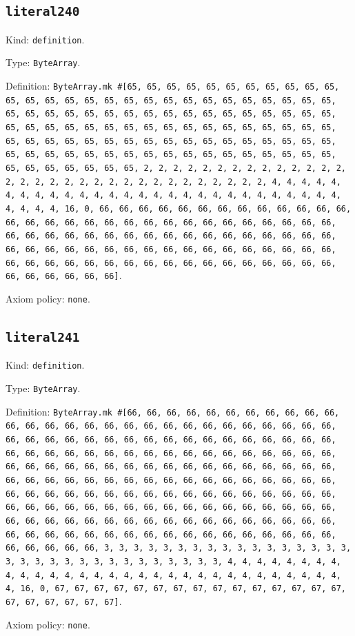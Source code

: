 \documentclass[11pt]{article}
\begin{document}
\subsection*{\texttt{literal240}}
\noindent Kind: \texttt{definition}.\par
\noindent Type: \texttt{ByteArray}.\par
\noindent Definition: \texttt{ByteArray.mk \#[65, 65, 65, 65, 65, 65, 65, 65, 65, 65, 65, 65, 65, 65, 65, 65, 65, 65, 65, 65, 65, 65, 65, 65, 65, 65, 65, 65, 65, 65, 65, 65, 65, 65, 65, 65, 65, 65, 65, 65, 65, 65, 65, 65, 65, 65, 65, 65, 65, 65, 65, 65, 65, 65, 65, 65, 65, 65, 65, 65, 65, 65, 65, 65, 65, 65, 65, 65, 65, 65, 65, 65, 65, 65, 65, 65, 65, 65, 65, 65, 65, 65, 65, 65, 65, 65, 65, 65, 65, 65, 65, 65, 65, 65, 65, 65, 65, 65, 65, 65, 65, 65, 65, 2, 2, 2, 2, 2, 2, 2, 2, 2, 2, 2, 2, 2, 2, 2, 2, 2, 2, 2, 2, 2, 2, 2, 2, 2, 2, 2, 2, 2, 2, 2, 2, 4, 4, 4, 4, 4, 4, 4, 4, 4, 4, 4, 4, 4, 4, 4, 4, 4, 4, 4, 4, 4, 4, 4, 4, 4, 4, 4, 4, 4, 4, 4, 4, 16, 0, 66, 66, 66, 66, 66, 66, 66, 66, 66, 66, 66, 66, 66, 66, 66, 66, 66, 66, 66, 66, 66, 66, 66, 66, 66, 66, 66, 66, 66, 66, 66, 66, 66, 66, 66, 66, 66, 66, 66, 66, 66, 66, 66, 66, 66, 66, 66, 66, 66, 66, 66, 66, 66, 66, 66, 66, 66, 66, 66, 66, 66, 66, 66, 66, 66, 66, 66, 66, 66, 66, 66, 66, 66, 66, 66, 66, 66, 66, 66, 66, 66, 66, 66, 66, 66, 66, 66]}.\par
\noindent Axiom policy: \texttt{none}.\par
\subsection*{\texttt{literal241}}
\noindent Kind: \texttt{definition}.\par
\noindent Type: \texttt{ByteArray}.\par
\noindent Definition: \texttt{ByteArray.mk \#[66, 66, 66, 66, 66, 66, 66, 66, 66, 66, 66, 66, 66, 66, 66, 66, 66, 66, 66, 66, 66, 66, 66, 66, 66, 66, 66, 66, 66, 66, 66, 66, 66, 66, 66, 66, 66, 66, 66, 66, 66, 66, 66, 66, 66, 66, 66, 66, 66, 66, 66, 66, 66, 66, 66, 66, 66, 66, 66, 66, 66, 66, 66, 66, 66, 66, 66, 66, 66, 66, 66, 66, 66, 66, 66, 66, 66, 66, 66, 66, 66, 66, 66, 66, 66, 66, 66, 66, 66, 66, 66, 66, 66, 66, 66, 66, 66, 66, 66, 66, 66, 66, 66, 66, 66, 66, 66, 66, 66, 66, 66, 66, 66, 66, 66, 66, 66, 66, 66, 66, 66, 66, 66, 66, 66, 66, 66, 66, 66, 66, 66, 66, 66, 66, 66, 66, 66, 66, 66, 66, 66, 66, 66, 66, 66, 66, 66, 66, 66, 66, 66, 66, 66, 66, 66, 66, 66, 66, 66, 66, 66, 66, 66, 66, 66, 66, 66, 66, 66, 3, 3, 3, 3, 3, 3, 3, 3, 3, 3, 3, 3, 3, 3, 3, 3, 3, 3, 3, 3, 3, 3, 3, 3, 3, 3, 3, 3, 3, 3, 3, 3, 4, 4, 4, 4, 4, 4, 4, 4, 4, 4, 4, 4, 4, 4, 4, 4, 4, 4, 4, 4, 4, 4, 4, 4, 4, 4, 4, 4, 4, 4, 4, 4, 16, 0, 67, 67, 67, 67, 67, 67, 67, 67, 67, 67, 67, 67, 67, 67, 67, 67, 67, 67, 67, 67, 67]}.\par
\noindent Axiom policy: \texttt{none}.\par
\end{document}
